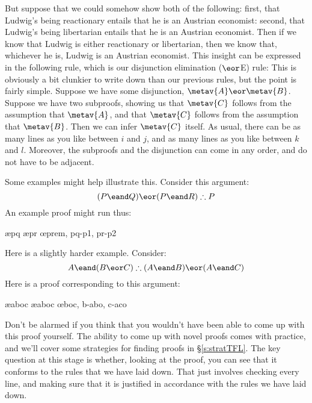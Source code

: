 But suppose that we could somehow show both of the following: first, that Ludwig's being reactionary entails that he is an Austrian economist: second, that Ludwig's being libertarian entails that he is an Austrian economist. Then if we know that Ludwig is either reactionary or libertarian, then we know that, whichever he is, Ludwig is an Austrian economist. This insight can be expressed in the following rule, which is our disjunction elimination ($\eor$E) rule:
This is obviously a bit clunkier to write down than our previous rules, but the point is fairly simple. Suppose we have some disjunction, $\metav{A} \eor \metav{B}$. Suppose we have two subproofs, showing us that $\metav{C}$ follows from the assumption that $\metav{A}$, and that $\metav{C}$ follows from the assumption that $\metav{B}$. Then we can infer $\metav{C}$ itself. As usual, there can be as many lines as you like between $i$ and $j$, and as many lines as you like between $k$ and $l$. Moreover, the subproofs and the disjunction can come in any order, and do not have to be adjacent.

Some examples might help illustrate this. Consider this argument:
$$(P \eand Q) \eor (P \eand R) \therefore P$$
An example proof might run thus:
	\begin{fitchproof}
			\open
				\ae{pq}
			\close
			\open
				\ae{pr}
			\close
		\oe{prem, pq-p1, pr-p2}
	\end{fitchproof}
Here is a slightly harder example. Consider:
	$$ A \eand (B \eor C) \therefore (A \eand B) \eor (A \eand C)$$
Here is a proof corresponding to this argument:
	\begin{fitchproof}
		\hypo{aboc}{A \eand (B \eor C)}
		\ae{aboc}
		\ae{aboc}
		\open
			\hypo{b}{B}
			\ai{a,b}
			\have{abo}{(A \eand B) \eor (A \eand C)}\oi{ab}
		\close
		\open
			\hypo{c}{C}
			\ai{a,c}
			\have{aco}{(A \eand B) \eor (A \eand C)}\oi{ac}
		\close
	\oe{boc, b-abo, c-aco}
	\end{fitchproof}
Don't be alarmed if you think that you wouldn't have been able to come up with this proof yourself. The ability to come up with novel proofs comes with practice, and we'll cover some strategies for finding proofs in \S\ref{s:stratTFL}. The key question at this stage is whether, looking at the proof, you can see that it conforms to the rules that we have laid down. That just involves checking every line, and making sure that it is justified in accordance with the rules we have laid down.


